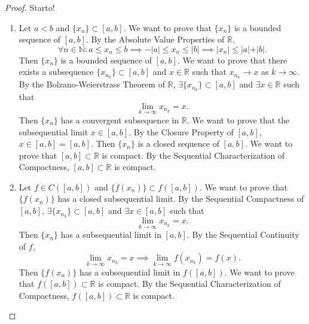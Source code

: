 \documentclass[12pt]{article}
\theoremstyle{definition}
\begin{document}
\begin{proof}
    Starto!
    \begin{enumerate}[label=(\alph*)]
        \item Let \(a < b\) and \(\{x_n\} \subset [a, b]\). We want to prove that \(\{x_n\}\) is a bounded sequence of \([a, b]\). By the Absolute Value Properties of \(\mathbb{R}\),
        \[
            \forall n \in \mathbb{N} : a \leq x_n \leq b \implies - \vert a \vert \leq x_n \leq \vert b \vert \implies \vert x_n \vert \leq \vert a \vert + \vert b \vert.
        \]
        Then \(\{x_n\}\) is a bounded sequence of \([a, b]\). We want to prove that there exists a subsequence \(\{x_{n_k}\} \subset [a, b]\) and \(x \in \mathbb{R}\) such that \(x_{n_k} \to x\) as \(k \to \infty\). By the Bolzano-Weierstrass Theorem of \(\mathbb{R}\), \(\exists \{x_{n_k}\} \subset [a, b]\) and \(\exists x \in \mathbb{R}\) such that
        \[
            \lim_{k \to \infty}x_{n_k} = x.
        \]
        Then \(\{x_n\}\) has a convergent subsequence in \(\mathbb{R}\). We want to prove that the subsequential limit \(x \in [a, b]\). By the Closure Property of \([a, b]\), \(x \in \overline{[a, b]} = [a, b]\). Then \(\{x_n\}\) is a closed sequence of \([a, b]\). We want to prove that \([a, b] \subset \mathbb{R}\) is compact. By the Sequential Characterization of Compactness, \([a, b] \subset \mathbb{R}\) is compact.
        \item Let \(f \in C([a, b])\) and \(\{f(x_n)\} \subset f([a, b])\). We want to prove that \(\{f(x_n)\}\) has a closed subsequential limit. By the Sequential Compactness of \([a, b]\), \(\exists \{x_{n_k}\} \subset [a, b]\) and \(\exists x \in [a, b]\) such that
        \[
            \lim_{k \to \infty}x_{n_k} = x.
        \]
        Then \(\{x_n\}\) has a subsequential limit in \([a, b]\). By the Sequential Continuity of \(f\), 
        \[
            \lim_{k \to \infty}x_{n_k} = x \implies \lim_{k \to \infty}f(x_{n_k}) = f(x).
        \]
        Then \(\{f(x_n)\}\) has a subsequential limit in \(f([a, b])\). We want to prove that \(f([a, b]) \subset \mathbb{R}\) is compact. By the Sequential Characterization of Compactness, \(f([a, b]) \subset \mathbb{R}\) is compact.
    \end{enumerate}
\end{proof}
\end{document}
